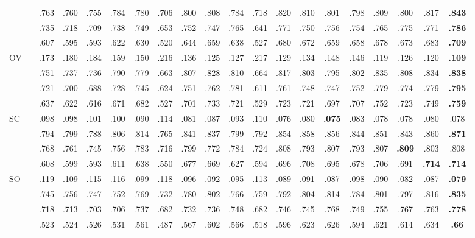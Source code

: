 \documentclass[lettersize,journal]{IEEEtran}
\begin{document}
\begin{table*}
\begin{tabular}{l|r|ccccccccccccccccc|c}
						&   & .763 & .760 & .755 & .784 & .780 & .706 & .800 & .808 & .784 & .718 & .820 & .810 & .801 & .798 & .809 & .800 & .817 & \textbf{.843} \\
						&  & .735 & .718 & .709 & .738 & .749 & .653 & .752 & .747 & .765 & .641 & .771 & .750 & .756 & .754 & .765 & .775 & .771 & \textbf{.786} \\
						&  &.607 & .595 & .593 & .622 & .630 & .520 & .644 & .659 & .638 & .527 & .680 & .672 & .659 & .658 & .678 & .673 & .683 & \textbf{.709} \\
	\hline \multirow{4}{*}{OV} &  & .173 & .180 & .184 & .159 & .150 & .216 & .136 & .125 & .127 & .217 & .129 & .134 & .148 & .146 & .119 & .126 & .120 & \textbf{.109} \\
						&   & .751 & .737 & .736 & .790 & .779 & .663 & .807 & .828 & .810 & .664 & .817 & .803 & .795 & .802 & .835 & .808 & .834 & \textbf{.838} \\
						&  & .721 & .700 & .688 & .728 & .745 & .624 & .751 & .762 & .781 & .611 & .761 & .748 & .747 & .752 & .779 & .774 & .779 & \textbf{.795} \\
						&  & .637 & .622 & .616 & .671 & .682 & .527 & .701 & .733 & .721 & .529 & .723 & .721 & .697 & .707 & .752 & .723 & .749 & \textbf{.759} \\
	\hline \multirow{4}{*}{SC} &  &.098 & .098 & .101 & .100 & .090 & .114 & .081 & .087 & .093 & .110 & .076 & .080 & \textbf{.075} & .083 & .078 & .078 & .080 & .078 \\
						&   & .794 & .799 & .788 & .806 & .814 & .765 & .841 & .837 & .799 & .792 & .854 & .858 & .856 & .844 & .851 & .843 & .860 & \textbf{.871} \\
						&  & .768 & .761 & .745 & .756 & .783 & .716 & .799 & .772 & .784 & .724 & .808 & .793 & .807 & .793 & .807 & \textbf{.809} & .803 & .808 \\
						&  & .608 & .599 & .593 & .611 & .638 & .550 & .677 & .669 & .627 & .594 & .696 & .708 & .695 & .678 & .706 & .691 & \textbf{.714} & \textbf{.714} \\
	\hline \multirow{4}{*}{SO} &  & .119 & .109 & .115 & .116 & .099 & .118 & .096 & .092 & .095 & .113 & .089 & .091 & .087 & .098 & .090 & .082 & .087 & \textbf{.079} \\
						&   & .745 & .756 & .747 & .752 & .769 & .732 & .780 & .802 & .766 & .759 & .792 & .804 & .814 & .784 & .801 & .797 & .816 & \textbf{.835} \\
						&  & .718 & .713 & .703 & .706 & .737 & .682 & .732 & .736 & .748 & .682 & .746 & .745 & .768 & .749 & .755 & .767 & .763 & \textbf{.778} \\
						&  & .523 & .524 & .526 & .531 & .561 & .487 & .567 & .602 & .566 & .518 & .596 & .623 & .626 & .594 & .621 & .614 & .634 & \textbf{.66} \\
	\hline    
\end{tabular}
\label{tab:soc}
\end{table*}
\end{document}
